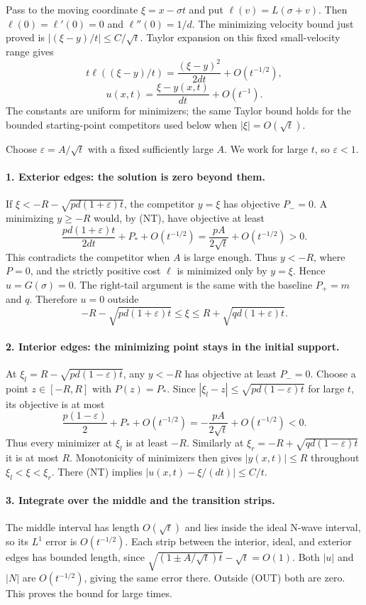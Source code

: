 \begin{expandedproof}
Pass to the moving coordinate $\xi=x-\sigma t$ and put
$\ell(v)=L(\sigma+v)$. Then
$\ell(0)=\ell'(0)=0$ and $\ell''(0)=1/d$.
The minimizing velocity bound just proved is $|(\xi-y)/t|\leq C/\sqrt t$.
Taylor expansion on this fixed small-velocity range gives
\[
 t\ell((\xi-y)/t)=\frac{(\xi-y)^2}{2dt}+O(t^{-1/2}),
\]
\[
 u(x,t)=\frac{\xi-y(x,t)}{dt}+O(t^{-1}).
 \tag{NT}
\]
The constants are uniform for minimizers; the same Taylor bound holds
for the bounded starting-point competitors used below when $|\xi|=O(\sqrt t)$.

Choose $\varepsilon=A/\sqrt t$ with a fixed sufficiently large $A$.
We work for large $t$, so $\varepsilon<1$.

\paragraph{1. Exterior edges: the solution is zero beyond them.}
If $\xi<-R-\sqrt{pd(1+\varepsilon)t}$, the competitor $y=\xi$ has
objective $P_-=0$.
A minimizing $y\geq-R$ would, by (NT), have objective at least
\[
 \frac{pd(1+\varepsilon)t}{2dt}+P_*+O(t^{-1/2})
 =\frac{pA}{2\sqrt t}+O(t^{-1/2})>0.
\]
This contradicts the competitor when $A$ is large enough.
Thus $y<-R$, where $P=0$, and the strictly positive cost $\ell$
is minimized only by $y=\xi$. Hence $u=G(\sigma)=0$.
The right-tail argument is the same with the baseline $P_+=m$ and $q$.
Therefore $u=0$ outside
\[
 -R-\sqrt{pd(1+\varepsilon)t}
 \leq \xi\leq
 R+\sqrt{qd(1+\varepsilon)t}.
 \tag{OUT}
\]

\paragraph{2. Interior edges: the minimizing point stays in the initial support.}
At $\xi_l=R-\sqrt{pd(1-\varepsilon)t}$, any $y<-R$ has objective
at least $P_-=0$. Choose a point $z\in[-R,R]$ with $P(z)=P_*$.
Since $|\xi_l-z|\leq\sqrt{pd(1-\varepsilon)t}$ for large $t$,
its objective is at most
\[
 \frac{p(1-\varepsilon)}2+P_*+O(t^{-1/2})
 =-\frac{pA}{2\sqrt t}+O(t^{-1/2})<0.
\]
Thus every minimizer at $\xi_l$ is at least $-R$.
Similarly at $\xi_r=-R+\sqrt{qd(1-\varepsilon)t}$ it is at most $R$.
Monotonicity of minimizers then gives $|y(x,t)|\leq R$
throughout $\xi_l<\xi<\xi_r$.
There (NT) implies
$|u(x,t)-\xi/(dt)|\leq C/t$.

\paragraph{3. Integrate over the middle and the transition strips.}
The middle interval has length $O(\sqrt t)$ and lies inside the ideal
N-wave interval, so its $L^1$ error is $O(t^{-1/2})$.
Each strip between the interior, ideal, and exterior edges has bounded
length, since
$\sqrt{(1\pm A/\sqrt t)t}-\sqrt t=O(1)$.
Both $|u|$ and $|N|$ are $O(t^{-1/2})$, giving the same error there.
Outside (OUT) both are zero. This proves the bound for large times.


\end{expandedproof}

